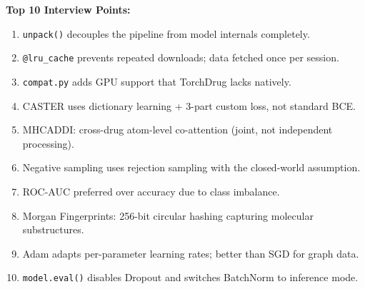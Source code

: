 \documentclass[12pt,a4paper,oneside]{book}
\begin{document}
\begin{tcolorbox}[cheatbox,title={ChemoInteract -- Complete Cheat Sheet}]
\medskip
\textbf{Top 10 Interview Points:}
\begin{enumerate}[noitemsep]
  \item \texttt{unpack()} decouples the pipeline from model internals completely.
  \item \texttt{@lru\_cache} prevents repeated downloads; data fetched once per session.
  \item \texttt{compat.py} adds GPU support that TorchDrug lacks natively.
  \item CASTER uses dictionary learning + 3-part custom loss, not standard BCE.
  \item MHCADDI: cross-drug atom-level co-attention (joint, not independent processing).
  \item Negative sampling uses rejection sampling with the closed-world assumption.
  \item ROC-AUC preferred over accuracy due to class imbalance.
  \item Morgan Fingerprints: 256-bit circular hashing capturing molecular substructures.
  \item Adam adapts per-parameter learning rates; better than SGD for graph data.
  \item \texttt{model.eval()} disables Dropout and switches BatchNorm to inference mode.
\end{enumerate}

\end{tcolorbox}

\printindex
\end{document}
